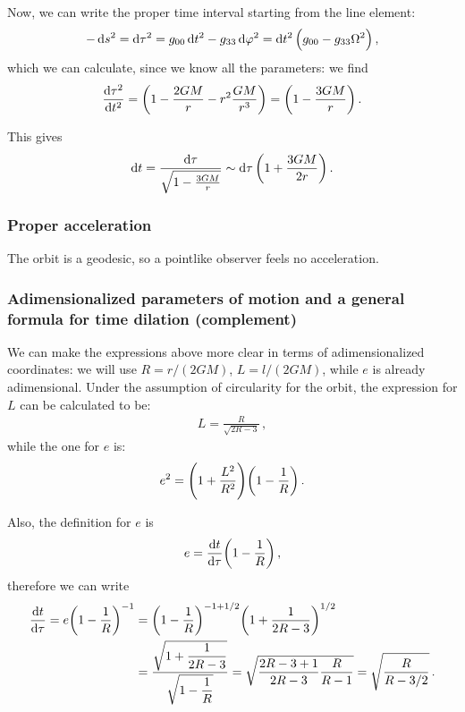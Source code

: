 \documentclass[main.tex]{subfiles}
\begin{document}
Now, we can write the proper time interval starting from the line element: 
%
\begin{align}
  - \dd{s^2} = \dd{\tau^2} 
  = g_{00} \dd{t^2} - g_{33} \dd{\varphi^2}
  = \dd{t^2} \qty(g_{00} - g_{33} \Omega^2)
\,,
\end{align}
%
which we can calculate, since we know all the parameters: we find
%
\begin{align}
  \frac{\dd{\tau^2 }}{ \dd{t^2}} = \qty(1 - \frac{2GM}{r} - r^2 \frac{GM}{r^3})
  = \qty(1 - \frac{3GM}{r})
\,.
\end{align}

This gives 
%
\begin{align}
  \dd{t}  = \frac{\dd{\tau }}{\sqrt{1 - \frac{3GM}{r}}}
  \sim \dd{\tau } \qty(1 + \frac{3GM}{2r})
\,.
\end{align}
%


\subsubsection{Proper acceleration}

The orbit is a geodesic, so a pointlike observer feels no acceleration. 

\subsubsection{Adimensionalized parameters of motion and a general formula for time dilation (complement)} \label{sec:general-time-dilation}

We can make the expressions above more clear in terms of adimensionalized coordinates: we will use \(R = r/(2GM)\), \(L = l / (2GM)\), while \(e\) is already adimensional. 
Under the assumption of circularity for the orbit, the expression for \(L\) can be calculated to be:
%
\begin{align}
  L  =\frac{R}{\sqrt{2 R - 3}}
\,,
\end{align}
%
while the one for \(e\) is: 
%
\begin{align}
  e^2 = \qty(1 + \frac{L^2}{R^2}) \qty(1 - \frac{1}{R})
\,.
\end{align}

Also, the definition for \(e\) is 
%
\begin{align}
  e = \dv{t}{\tau } \qty(1 - \frac{1}{R})
\,,
\end{align}
%
therefore we can write 
%
\begin{align}
  \dv{t}{ \tau } = e \qty(1-\frac{1}{R})^{-1} &= \qty(1 - \frac{1}{R})^{-1+1/2} \qty(1+ \frac{1}{2 R - 3})^{1/2} \\
  &= \frac{\sqrt{1 + \displaystyle \frac{1}{2R-3}}}{\sqrt{ 1- \displaystyle \frac{1}{R}}}
  = \sqrt{ \frac{2R-3+1}{2R-3} \frac{R}{R-1}} 
  = \sqrt{\frac{R}{R - 3/2}}
\,.
\end{align}
\end{document}
